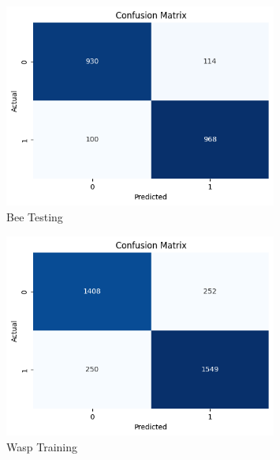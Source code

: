 \documentclass[12pt]{article}
\begin{document}
\begin{enumerate}
\begin{figure}[H]
			\begin{minipage}{0.45\textwidth}    
				\centering
				\includegraphics[width=0.8\textwidth]{Images/Confusion/mobile bees test.png} \\ \vspace{0.25 cm}
				Bee Testing
			\end{minipage}
			\newline
			\begin{minipage}{0.45\textwidth}
				\vspace{ 1.5 cm}
				\centering
				\includegraphics[width=0.8\textwidth]{Images/Confusion/mobile wasps train.png} \\ \vspace{0.25 cm}
				Wasp Training
			\end{minipage}
			\hfill
			\begin{minipage}{0.45\textwidth}
				\centering

\end{minipage}
\end{figure}
\end{enumerate}
\end{document}
